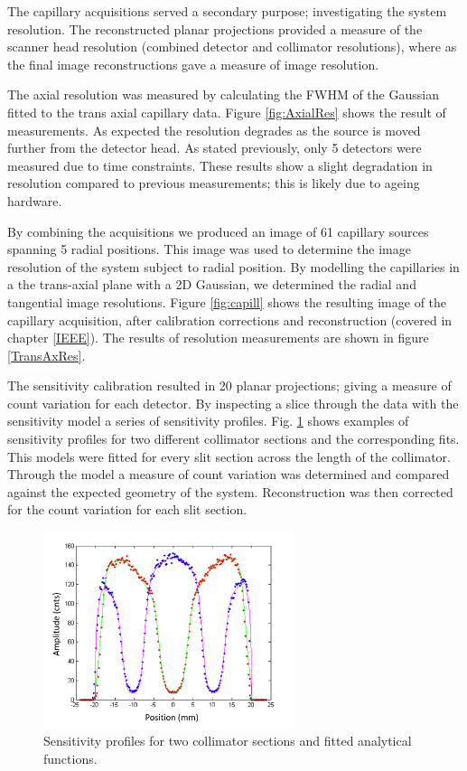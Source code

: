 The capillary acquisitions served a secondary purpose; investigating the system resolution. The reconstructed planar projections provided a measure of the scanner head resolution (combined detector and collimator resolutions), where as the final image reconstructions gave a measure of image resolution. 

The axial resolution was measured by calculating the \acrshort{FWHM} of the Gaussian fitted to the trans axial capillary data. Figure \ref{fig:AxialRes} shows the result of measurements. As expected the resolution degrades as the source is moved further from the detector head. As stated previously, only 5 detectors were measured due to time constraints. These results show a slight degradation in resolution compared to previous measurements; this is likely due to ageing hardware. 

By combining the acquisitions we produced an image of 61 capillary
sources spanning 5 radial positions. This image was used to
determine the image resolution of the system subject to radial
position. By modelling the capillaries in a the trans-axial plane
with a 2D Gaussian, we determined the radial and tangential
image resolutions. Figure \ref{fig:capill} shows the resulting image of the capillary acquisition, after calibration corrections and reconstruction (covered in chapter \ref{IEEE}). The results of resolution measurements are shown in figure \ref{TransAxRes}. 

The sensitivity calibration resulted in 20 planar projections; giving a measure of count variation for each detector. By inspecting a slice through the data with the sensitivity model a series of sensitivity profiles. Fig. \ref{fig_sensprof} shows examples of sensitivity profiles for two different collimator sections and the corresponding fits. This models were fitted for every slit section across the length of the collimator. Through the model a measure of count variation was determined and compared against the expected geometry of the system. Reconstruction was then corrected for the count variation for each slit section. 

\begin{figure}[!t]
\centering
\includegraphics[width=2.9in]{figures/sns_prof.png}
\caption{Sensitivity profiles for two collimator sections and fitted analytical functions.}
\label{fig_sensprof}
\end{figure}

